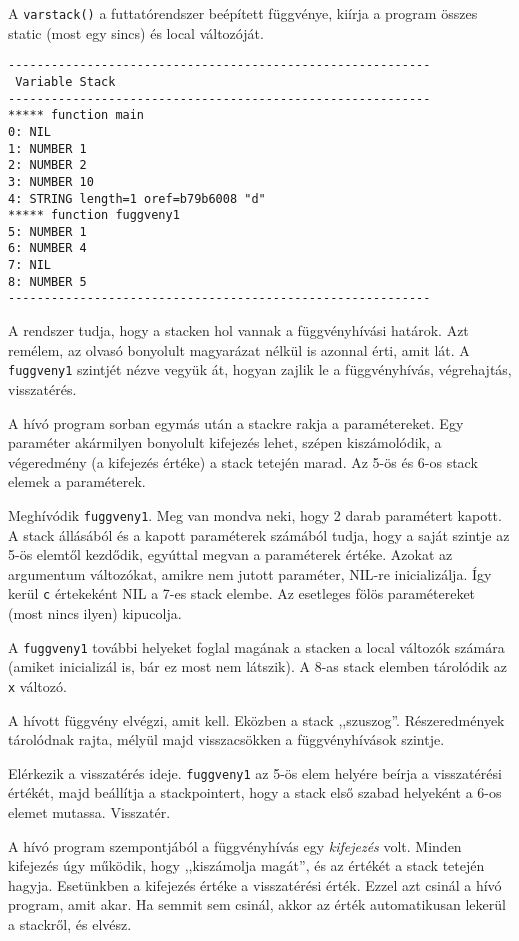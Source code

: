 A \verb!varstack()! a futtatórendszer beépített függvénye,
kiírja a program összes static (most egy sincs) és local változóját.

\begin{verbatim}
-----------------------------------------------------------
 Variable Stack
-----------------------------------------------------------
***** function main
0: NIL
1: NUMBER 1
2: NUMBER 2
3: NUMBER 10
4: STRING length=1 oref=b79b6008 "d"
***** function fuggveny1
5: NUMBER 1
6: NUMBER 4
7: NIL
8: NUMBER 5
-----------------------------------------------------------
\end{verbatim}
A rendszer tudja, hogy a stacken hol vannak a függvényhívási határok.
Azt remélem, az olvasó bonyolult magyarázat nélkül is azonnal érti, amit lát.
A \verb!fuggveny1! szintjét nézve vegyük át, hogyan zajlik le a függvényhívás,
végrehajtás, visszatérés.

    A hívó program sorban egymás után a stackre rakja a 
      paramétereket. Egy paraméter akármilyen bonyolult kifejezés lehet,
      szépen kiszámolódik, a végeredmény (a kifejezés értéke) a stack 
      tetején marad.  Az 5-ös és 6-os stack elemek a paraméterek.

    Meghívódik \verb!fuggveny1!. Meg van mondva neki, 
      hogy 2 darab paramétert kapott. A stack állásából és 
      a kapott paraméterek számából tudja, hogy a saját szintje
      az 5-ös elemtől kezdődik, egyúttal megvan a paraméterek értéke.
      Azokat az argumentum változókat, amikre nem jutott paraméter, 
      NIL-re inicializálja. Így kerül \verb!c! értekeként NIL a 7-es stack elembe.
      Az esetleges fölös paramétereket (most nincs ilyen) kipucolja.

    A \verb!fuggveny1! további helyeket foglal magának a stacken
      a local változók számára (amiket inicializál is, bár ez most nem látszik).
      A 8-as stack elemben tárolódik az \verb!x! változó.

    A hívott függvény elvégzi, amit kell. 
      Eközben a stack ,,szuszog''. Részeredmények tárolódnak
      rajta, mélyül majd visszacsökken a függvényhívások szintje. 

    Elérkezik a visszatérés ideje. \verb!fuggveny1! 
      az 5-ös elem helyére beírja a visszatérési értékét,
      majd beállítja a stackpointert, hogy a stack első szabad helyeként
      a 6-os elemet mutassa. Visszatér.    

    A hívó program szempontjából a függvényhívás egy {\em kifejezés\/} volt.
      Minden kifejezés úgy működik, hogy ,,kiszámolja magát'', 
      és az értékét a stack tetején hagyja. Esetünkben a kifejezés értéke
      a visszatérési érték. Ezzel azt csinál a hívó program, amit akar.
      Ha semmit sem csinál, akkor az érték automatikusan lekerül a stackről,
      és elvész.
      

